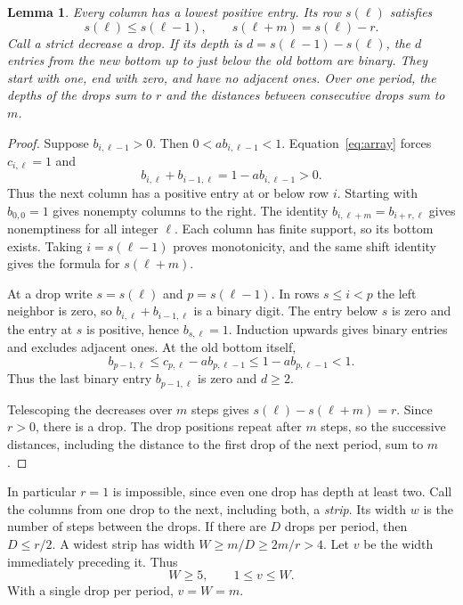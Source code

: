 \documentclass[11pt,reqno]{amsart}
\numberwithin{equation}{section}
\newtheorem{lemma}[theorem]{Lemma}
\begin{document}
\begin{lemma}\label{lem:geometry}
Every column has a lowest positive entry. Its row $s(\ell)$ satisfies
\[
 s(\ell)\le s(\ell-1),\qquad s(\ell+m)=s(\ell)-r .
\]
Call a strict decrease a \emph{drop}. If its depth is $d=s(\ell-1)-s(\ell)$, the $d$ entries from the new bottom up to just below the old bottom are binary. They start with one, end with zero, and have no adjacent ones. Over one period, the depths of the drops sum to $r$ and the distances between consecutive drops sum to $m$.
\end{lemma}
\begin{proof}
Suppose $b_{i,\ell-1}>0$. Then $0<a b_{i,\ell-1}<1$. Equation~\eqref{eq:array} forces $c_{i,\ell}=1$ and
\[
 b_{i,\ell}+b_{i-1,\ell}=1-a b_{i,\ell-1}>0.
\]
Thus the next column has a positive entry at or below row $i$. Starting with $b_{0,0}=1$ gives nonempty columns to the right. The identity $b_{i,\ell+m}=b_{i+r,\ell}$ gives nonemptiness for all integer $\ell$. Each column has finite support, so its bottom exists. Taking $i=s(\ell-1)$ proves monotonicity, and the same shift identity gives the formula for $s(\ell+m)$.

At a drop write $s=s(\ell)$ and $p=s(\ell-1)$. In rows $s\le i<p$ the left neighbor is zero, so $b_{i,\ell}+b_{i-1,\ell}$ is a binary digit. The entry below $s$ is zero and the entry at $s$ is positive, hence $b_{s,\ell}=1$. Induction upwards gives binary entries and excludes adjacent ones. At the old bottom itself,
\[
 b_{p-1,\ell}\le c_{p,\ell}-a b_{p,\ell-1}\le 1-a b_{p,\ell-1}<1 .
\]
Thus the last binary entry $b_{p-1,\ell}$ is zero and $d\ge2$.

Telescoping the decreases over $m$ steps gives $s(\ell)-s(\ell+m)=r$. Since $r>0$, there is a drop. The drop positions repeat after $m$ steps, so the successive distances, including the distance to the first drop of the next period, sum to $m$.
\end{proof}

In particular $r=1$ is impossible, since even one drop has depth at least two. Call the columns from one drop to the next, including both, a \emph{strip}. Its width $w$ is the number of steps between the drops. If there are $D$ drops per period, then $D\le r/2$. A widest strip has width $W\ge m/D\ge 2m/r>4$. Let $v$ be the width immediately preceding it. Thus
\begin{equation}\label{eq:max}
 W\ge5,\qquad 1\le v\le W .
\end{equation}
With a single drop per period, $v=W=m$.
\end{document}
